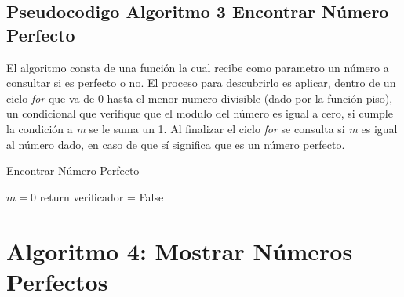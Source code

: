     \subsection{Pseudocodigo Algoritmo 3 Encontrar Número Perfecto}
        El algoritmo consta de una función la cual recibe como parametro un número a consultar si es perfecto o no. El proceso para descubrirlo es aplicar, dentro de un ciclo \textit{for} que va de 0 hasta el menor numero divisible (dado por la función piso), un condicional que verifique que el modulo del número es igual a cero, si cumple la condición a \textit{m} se le suma un 1. Al finalizar el ciclo \textit{for} se consulta si \textit{m} es igual al número dado, en caso de que sí significa que es un número perfecto.
        \begin{algorithm}
            \caption{Encontrar Número Perfecto
            }\label{alg:two}
            $m = 0$\;
            {
                return verificador = False\;
            }
            
        \end{algorithm}

\newpage
\section{Algoritmo 4: Mostrar Números Perfectos}
   

